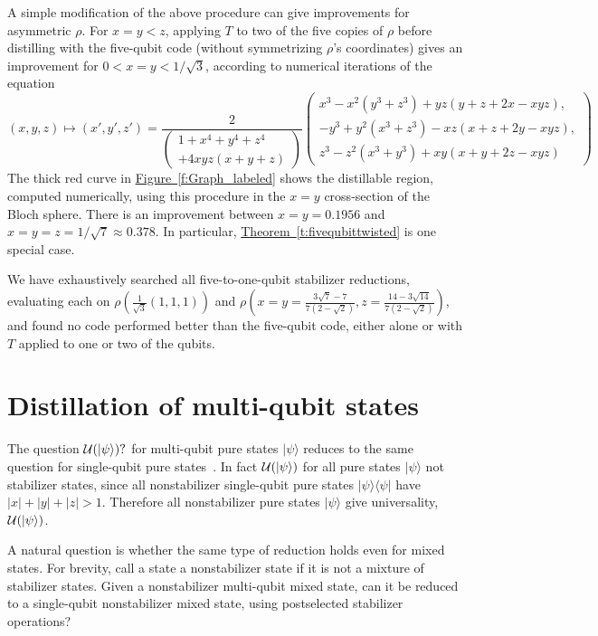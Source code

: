 \documentclass[11pt]{article}
\def\ket #1{\vert #1\rangle}
\def\bra #1{\langle #1\vert}
\def\ketbra #1#2{\ket{#1}\!\bra{#2}}
\def\abs #1{\lvert #1\rvert}
\theoremstyle{note}
\newcommand{\thmref}[1]{\hyperref[#1]{{Theorem~\ref*{#1}}}}
\newcommand{\figref}[1]{\hyperref[#1]{{Figure~\ref*{#1}}}}
\begin{document}
A simple modification of the above procedure can give improvements for asymmetric $\rho$.  For $x = y < z$, applying $T$ to two of the five copies of $\rho$ before distilling with the five-qubit code (without symmetrizing $\rho$'s coordinates) gives an improvement for $0 < x=y < 1/\sqrt{3}$, according to numerical iterations of the equation 
\begin{equation}
(x,y,z) \mapsto (x',y',z') = \frac{2}{\left(\begin{split}1+x^4+y^4+z^4\\+4 x y z(x+y+z)\end{split}\right)}\left(\begin{split}x^3-x^2(y^3+z^3)+yz(y+z+2x-xyz),\\-y^3+y^2(x^3+z^3)-xz(x+z+2y-xyz),\\z^3-z^2(x^3+y^3)+xy(x+y+2z-xyz)\end{split}\right)
\end{equation}
The thick red curve in \figref{f:Graph_labeled} shows the distillable region, computed numerically, using this procedure in the $x=y$ cross-section of the Bloch sphere.  There is an improvement between $x=y=0.1956$ and $x=y=z=1/\sqrt{7} \approx 0.378$.  In particular, \thmref{t:fivequbittwisted} is one special case.  

We have exhaustively searched all five-to-one-qubit stabilizer reductions, evaluating each on $\rho(\tfrac{1}{\sqrt{3}}(1,1,1))$ and $\rho(x=y=\tfrac{3 \sqrt{7} - 7}{7 (2 - \sqrt{2})}, z =  \tfrac{14 - 3 \sqrt{14}}{7 (2 - \sqrt{2})})$, and found no code performed better than the five-qubit code, either alone or with $T$ applied to one or two of the qubits.


\section{Distillation of multi-qubit states} \label{s:twoqubitstate}

The question $\magic{\ket{\psi}}?$ for multi-qubit pure states $\ket{\psi}$ reduces to the same question for single-qubit pure states~\cite{Reichardt04magic}.  In fact $\magic{\ket{\psi}}$ for all pure states $\ket{\psi}$ not stabilizer states, since all nonstabilizer single-qubit pure states $\ketbra{\psi}{\psi}$ have $\abs{x}+\abs{y}+\abs{z} > 1$.  Therefore all nonstabilizer pure states $\ket{\psi}$ give universality, $\magic{\ket{\psi}}$.

A natural question is whether the same type of reduction holds even for mixed states.  For brevity, call a state a nonstabilizer state if it is not a mixture of stabilizer states.  Given a nonstabilizer multi-qubit mixed state, can it be reduced to a single-qubit nonstabilizer mixed state, using postselected stabilizer operations?  
\end{document}
